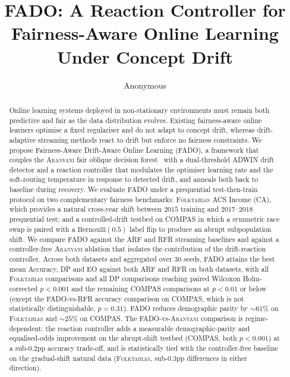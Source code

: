 \documentclass[sigconf,anonymous,review]{acmart}
\title{FADO: A Reaction Controller for Fairness-Aware Online Learning Under Concept Drift}
\author{Anonymous}
\affiliation{%
  \institution{Anonymous}
  \country{}}
\begin{document}
\begin{abstract}
  Online learning systems deployed in non-stationary environments must remain both predictive and fair as the data distribution evolves. Existing fairness-aware
  online learners optimise a fixed regulariser and do not adapt to concept drift, whereas drift-adaptive streaming methods react to drift but enforce no fairness
  constraints. We propose Fairness-Aware Drift-Aware Online Learning (\textsc{FADO}), a framework that couples the \textsc{Aranyani} fair oblique decision forest~\cite{chowdhury2024enhancing} with a
  dual-threshold ADWIN drift detector and a reaction controller that modulates the optimiser learning rate and the soft-routing temperature in response to
  detected drift, and anneals both back to baseline during recovery. We evaluate \textsc{FADO} under a prequential test-then-train protocol on two
  complementary fairness benchmarks: \textsc{Folktables} ACS Income (CA), which provides a natural cross-year shift between $2015$ training and
  $2017$--$2018$ prequential test; and a controlled-drift testbed on \textsc{COMPAS} in which a symmetric race swap is paired with a $\mathrm{Bernoulli}(0.5)$
  label flip to produce an abrupt subpopulation shift. We compare \textsc{FADO} against the \textsc{ARF} and \textsc{RFR} streaming baselines and against a
  controller-free \textsc{Aranyani} ablation that isolates the contribution of the drift-reaction controller. Across both datasets and aggregated over $30$
  seeds, \textsc{FADO} attains the best mean Accuracy, DP and EO against both \textsc{ARF} and \textsc{RFR} on both datasets, with all
  \textsc{Folktables} comparisons and all DP comparisons reaching paired Wilcoxon Holm-corrected $p<0.001$ and the remaining \textsc{COMPAS} comparisons at
  $p<0.01$ or below (except the \textsc{FADO}-vs-\textsc{RFR} accuracy comparison on \textsc{COMPAS}, which is not statistically distinguishable, $p=0.31$).
  \textsc{FADO} reduces demographic parity by $\sim$$61\%$ on \textsc{Folktables} and $\sim$$25\%$ on \textsc{COMPAS}. The
  \textsc{FADO}-vs-\textsc{Aranyani} comparison is regime-dependent: the reaction controller adds a measurable demographic-parity and equalised-odds
  improvement on the abrupt-shift testbed (\textsc{COMPAS}, both $p<0.001$) at a sub-$0.2$pp accuracy trade-off, and is statistically tied with the
  controller-free baseline on the gradual-shift natural data (\textsc{Folktables}, sub-$0.3$pp differences in either direction).
\end{abstract}

\end{document}
